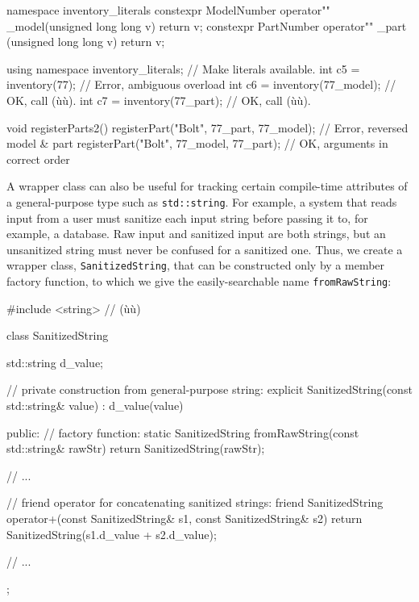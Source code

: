 \begin{emcppslisting}[emcppsbatch=e14]
namespace inventory_literals
{
    constexpr ModelNumber operator"" _model(unsigned long long v) { return v; }
    constexpr PartNumber  operator"" _part (unsigned long long v) { return v; }
}

using namespace inventory_literals;  // Make literals available.
int c5 = inventory(77);              // Error, ambiguous overload
int c6 = inventory(77_model);        // OK, call (ù{}ù).
int c7 = inventory(77_part);         // OK, call (ù{}ù).

void registerParts2()
{
    registerPart("Bolt", 77_part, 77_model); // Error, reversed model & part
    registerPart("Bolt", 77_model, 77_part); // OK, arguments in correct order
}
\end{emcppslisting}
    
\noindent A wrapper class can also be useful for tracking certain compile-time
attributes of a general-purpose type such as \lstinline!std::string!. For
example, a system that reads input from a user must sanitize each input
string before passing it to, for example, a database. Raw input and
sanitized input are both strings, but an unsanitized string must never
be confused for a sanitized one. Thus, we create a wrapper class,
\lstinline!SanitizedString!, that can be constructed only by a member
factory function, to which we give the easily-searchable name
\lstinline!fromRawString!:

\begin{emcppslisting}[emcppsbatch=e15]
#include <string>  // (ù{}ù)

class SanitizedString
{
    std::string d_value;

    // private construction from general-purpose string:
    explicit SanitizedString(const std::string& value) : d_value(value) { }

public:
    // factory function:
    static SanitizedString fromRawString(const std::string& rawStr)
    {
        return SanitizedString(rawStr);
    }

    // ...

    // friend operator for concatenating sanitized strings:
    friend SanitizedString operator+(const SanitizedString& s1,
                                     const SanitizedString& s2)
    {
        return SanitizedString(s1.d_value + s2.d_value);
    }

    // ...
};
\end{emcppslisting}
    
